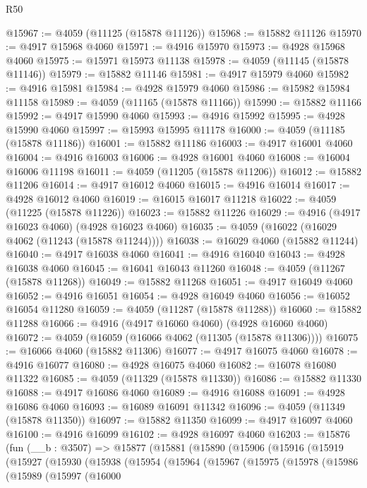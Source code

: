\begin{lexlean}{R50}
\begin{coremodule}
@15967 := @4059 (@11125 (@15878 @11126))
@15968 := @15882 @11126
@15970 := @4917 @15968 @4060
@15971 := @4916 @15970
@15973 := @4928 @15968 @4060
@15975 := @15971 @15973 @11138
@15978 := @4059 (@11145 (@15878 @11146))
@15979 := @15882 @11146
@15981 := @4917 @15979 @4060
@15982 := @4916 @15981
@15984 := @4928 @15979 @4060
@15986 := @15982 @15984 @11158
@15989 := @4059 (@11165 (@15878 @11166))
@15990 := @15882 @11166
@15992 := @4917 @15990 @4060
@15993 := @4916 @15992
@15995 := @4928 @15990 @4060
@15997 := @15993 @15995 @11178
@16000 := @4059 (@11185 (@15878 @11186))
@16001 := @15882 @11186
@16003 := @4917 @16001 @4060
@16004 := @4916 @16003
@16006 := @4928 @16001 @4060
@16008 := @16004 @16006 @11198
@16011 := @4059 (@11205 (@15878 @11206))
@16012 := @15882 @11206
@16014 := @4917 @16012 @4060
@16015 := @4916 @16014
@16017 := @4928 @16012 @4060
@16019 := @16015 @16017 @11218
@16022 := @4059 (@11225 (@15878 @11226))
@16023 := @15882 @11226
@16029 := @4916 (@4917 @16023 @4060) (@4928 @16023 @4060)
@16035 := @4059 (@16022 (@16029 @4062 (@11243 (@15878 @11244))))
@16038 := @16029 @4060 (@15882 @11244)
@16040 := @4917 @16038 @4060
@16041 := @4916 @16040
@16043 := @4928 @16038 @4060
@16045 := @16041 @16043 @11260
@16048 := @4059 (@11267 (@15878 @11268))
@16049 := @15882 @11268
@16051 := @4917 @16049 @4060
@16052 := @4916 @16051
@16054 := @4928 @16049 @4060
@16056 := @16052 @16054 @11280
@16059 := @4059 (@11287 (@15878 @11288))
@16060 := @15882 @11288
@16066 := @4916 (@4917 @16060 @4060) (@4928 @16060 @4060)
@16072 := @4059 (@16059 (@16066 @4062 (@11305 (@15878 @11306))))
@16075 := @16066 @4060 (@15882 @11306)
@16077 := @4917 @16075 @4060
@16078 := @4916 @16077
@16080 := @4928 @16075 @4060
@16082 := @16078 @16080 @11322
@16085 := @4059 (@11329 (@15878 @11330))
@16086 := @15882 @11330
@16088 := @4917 @16086 @4060
@16089 := @4916 @16088
@16091 := @4928 @16086 @4060
@16093 := @16089 @16091 @11342
@16096 := @4059 (@11349 (@15878 @11350))
@16097 := @15882 @11350
@16099 := @4917 @16097 @4060
@16100 := @4916 @16099
@16102 := @4928 @16097 @4060
@16203 := @15876
    (fun (__b : @3507) =>
    @15877
      (@15881
        (@15890
          (@15906
            (@15916
              (@15919
                (@15927
                  (@15930
                    (@15938
                      (@15954
                        (@15964
                          (@15967
                            (@15975
                              (@15978
                                (@15986
                                  (@15989
                                    (@15997
                                      (@16000

\end{coremodule}
\end{lexlean}
